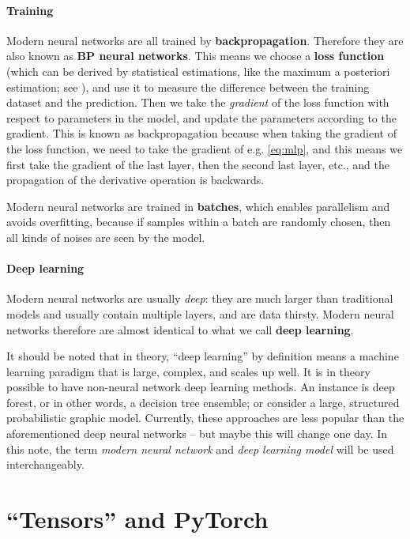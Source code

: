 \documentclass[hyperref, a4paper, 12pt]{report}
\newcommand*{\concept}[1]{{\textbf{#1}}}
\begin{document}
\paragraph*{Training}

Modern neural networks are all trained by \concept{backpropagation}.
Therefore they are also known as \concept{BP neural networks}.
This means we choose a \concept{loss function} (which can be derived by statistical estimations,
like the maximum a posteriori estimation; see ),
and use it to measure the difference between the training dataset and the prediction.
Then we take the \emph{gradient} of the loss function with respect to parameters in the model,
and update the parameters according to the gradient.
This is known as backpropagation because when taking the gradient of the loss function,
we need to take the gradient of e.g. \eqref{eq:mlp},
and this means we first take the gradient of the last layer,
then the second last layer, etc.,
and the propagation of the derivative operation is backwards.

Modern neural networks are trained in \concept{batches},
which enables parallelism and avoids overfitting,
because if samples within a batch are randomly chosen,
then all kinds of noises are seen by the model.

\paragraph*{Deep learning}
Modern neural networks are usually \emph{deep}:
they are much larger than traditional models and usually contain multiple layers,
and are data thirsty.
Modern neural networks therefore are almost identical to what we call \concept{deep learning}.

It should be noted that in theory, ``deep learning'' by definition means a machine learning paradigm that is large, complex, and scales up well.
It is in theory possible to have non-neural network deep learning methods.
An instance is deep forest, or in other words, a decision tree ensemble;
or consider a large, structured probabilistic graphic model.
Currently, these approaches are less popular than the aforementioned deep neural networks
-- but maybe this will change one day.
In this note, the term \emph{modern neural network} and \emph{deep learning model} will be used interchangeably.

\section{``Tensors'' and PyTorch}\label{sec:tensor}
\end{document}
